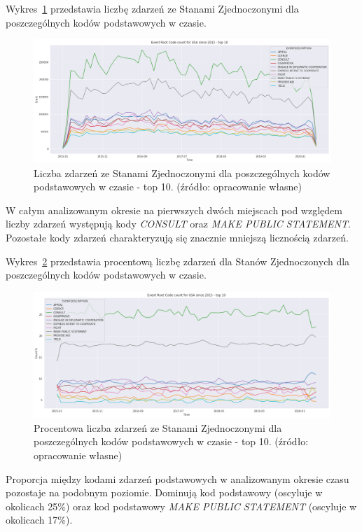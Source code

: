 \documentclass[11pt]{report}
\begin{document}
    Wykres~\ref{fig:USAPERCinTIME} przedstawia liczbę zdarzeń ze Stanami Zjednoczonymi dla poszczególnych kodów podstawowych w czasie.
    \begin{figure}[!htp]
        \centering
        \includegraphics[width=\linewidth]{fig/USA/USAERCinTIME.png}
        \caption{Liczba zdarzeń ze Stanami Zjednoczonymi dla poszczególnych kodów podstawowych w czasie - top 10. (źródło: opracowanie własne)}
        \label{fig:USAPERCinTIME}
    \end{figure}
    W całym analizowanym okresie na pierwszych dwóch miejscach pod względem liczby zdarzeń występują kody \textit{CONSULT} oraz \textit{MAKE PUBLIC STATEMENT}.
    Pozostałe kody zdarzeń charakteryzują się znacznie mniejszą licznością zdarzeń.

    Wykres~\ref{fig:USAPERCpercinTIME} przedstawia procentową liczbę zdarzeń dla Stanów Zjednoczonych dla poszczególnych kodów podstawowych w czasie.
    \begin{figure}[!htp]
        \centering
        \includegraphics[width=\linewidth]{fig/USA/USAERCpercinTIME.png}
        \caption{Procentowa liczba zdarzeń ze Stanami Zjednoczonymi dla poszczególnych kodów podstawowych w czasie - top 10. (źródło: opracowanie własne)}
        \label{fig:USAPERCpercinTIME}
    \end{figure}
    Proporcja między kodami zdarzeń podstawowych w analizowanym okresie czasu pozostaje na podobnym poziomie.
    Dominują kod podstawowy  (oscyluje w okolicach 25\%) oraz kod podstawowy \textit{MAKE PUBLIC STATEMENT} (oscyluje w okolicach 17\%).
\end{document}
